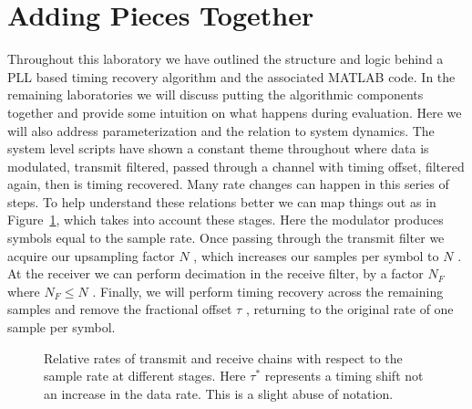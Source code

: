\documentclass[letterpaper,12pt]{article}
\begin{document}
\section{Adding Pieces Together}\label{sec:combined}
%
Throughout this laboratory we have outlined the structure and logic behind a PLL based timing recovery algorithm and the associated MATLAB code. In the remaining laboratories we will discuss putting the algorithmic components together and provide some intuition on what happens during evaluation. Here we will also address parameterization and the relation to system dynamics. The system level scripts have shown a constant theme throughout where data is modulated, transmit filtered, passed through a channel with timing offset, filtered again, then is timing recovered. Many rate changes can happen in this series of steps. To help understand these relations better we can map things out as in Figure~\ref{timecorr}, which takes into account these stages. Here the modulator produces symbols equal to the sample rate. Once passing through the transmit filter we acquire our upsampling factor $N$ , which increases our samples per symbol to $N$ . At the receiver we can perform decimation in the receive filter, by a factor $N_F$ where $N_F \leq N$ . Finally, we will perform timing recovery across the remaining samples and
remove the fractional offset $\tau$ , returning to the original rate of one sample per symbol.
%
\begin{figure}[!ht]
\centering
  \caption{Relative rates of transmit and receive chains with respect to the sample rate at different
stages. Here $\tau^*$ represents a timing shift not an increase in the data rate. This is a slight abuse of notation.}
\label{timecorr}
\end{figure}
\end{document}
